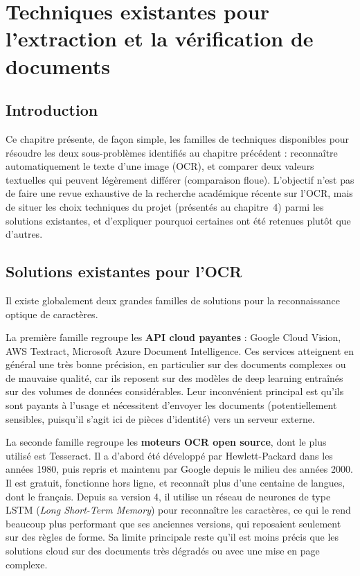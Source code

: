 \chapter{Techniques existantes pour l'extraction et la vérification de documents}
\minitoc
\newpage

\section{Introduction}

Ce chapitre présente, de façon simple, les familles de techniques disponibles pour résoudre les deux sous-problèmes identifiés au chapitre précédent : reconnaître automatiquement le texte d'une image (OCR), et comparer deux valeurs textuelles qui peuvent légèrement différer (comparaison floue). L'objectif n'est pas de faire une revue exhaustive de la recherche académique récente sur l'OCR, mais de situer les choix techniques du projet (présentés au chapitre~4) parmi les solutions existantes, et d'expliquer pourquoi certaines ont été retenues plutôt que d'autres.

\section{Solutions existantes pour l'OCR}

Il existe globalement deux grandes familles de solutions pour la reconnaissance optique de caractères.

La première famille regroupe les \textbf{API cloud payantes} : Google Cloud Vision, AWS Textract, Microsoft Azure Document Intelligence. Ces services atteignent en général une très bonne précision, en particulier sur des documents complexes ou de mauvaise qualité, car ils reposent sur des modèles de deep learning entraînés sur des volumes de données considérables. Leur inconvénient principal est qu'ils sont payants à l'usage et nécessitent d'envoyer les documents (potentiellement sensibles, puisqu'il s'agit ici de pièces d'identité) vers un serveur externe.

La seconde famille regroupe les \textbf{moteurs OCR open source}, dont le plus utilisé est Tesseract. Il a d'abord été développé par Hewlett-Packard dans les années 1980, puis repris et maintenu par Google depuis le milieu des années 2000. Il est gratuit, fonctionne hors ligne, et reconnaît plus d'une centaine de langues, dont le français. Depuis sa version 4, il utilise un réseau de neurones de type LSTM (\textit{Long Short-Term Memory}) pour reconnaître les caractères, ce qui le rend beaucoup plus performant que ses anciennes versions, qui reposaient seulement sur des règles de forme. Sa limite principale reste qu'il est moins précis que les solutions cloud sur des documents très dégradés ou avec une mise en page complexe.

